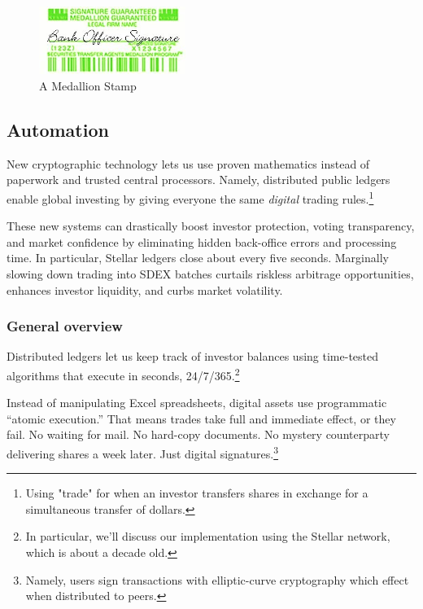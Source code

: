 \documentclass[11pt, english]{article}
\begin{document}
\begin{multicols}{2}
\begin{figure}[H]
    \centering
    \includegraphics[width=180]{imgs/medallion.jpg}
    \caption{A Medallion Stamp}
    \label{fig:decentralized}
\end{figure}

\subsection{Automation}

New cryptographic technology lets us use proven mathematics instead of paperwork and trusted central processors. Namely, distributed public ledgers enable global investing by giving everyone the same \textit{digital} trading rules.\footnote{Using "trade" for when an investor transfers shares in exchange for a simultaneous transfer of dollars.}

These new systems can drastically boost investor protection, voting transparency, and market confidence by eliminating hidden back-office errors and processing time. In particular, Stellar ledgers close about every five seconds. Marginally slowing down trading into SDEX batches curtails riskless arbitrage opportunities, enhances investor liquidity, and curbs market volatility. \cite{hft1, hft2, hft3}

\subsubsection{General overview}

Distributed ledgers let us keep track of investor balances using time-tested algorithms that execute in seconds, 24/7/365.\footnote{In particular, we'll discuss our implementation using the Stellar network, which is about a decade old.}

Instead of manipulating Excel spreadsheets, digital assets use programmatic ``atomic execution.'' That means trades take full and immediate effect, or they fail. No waiting for mail. No hard-copy documents. No mystery counterparty delivering shares a week later. Just digital signatures.\footnote{Namely, users sign transactions with elliptic-curve cryptography which effect when distributed to peers.}


\end{multicols}
\end{document}
